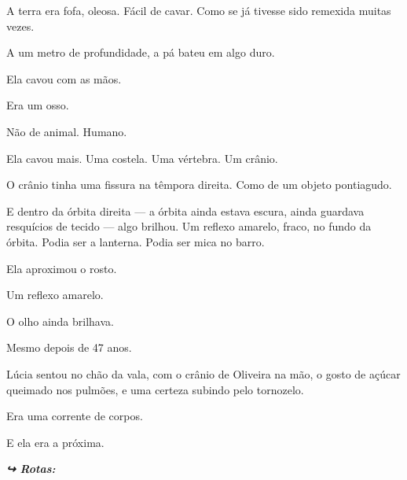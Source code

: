 \noindent A terra era fofa, oleosa. Fácil de cavar. Como se já tivesse sido remexida muitas vezes.

\noindent A um metro de profundidade, a pá bateu em algo duro.

\noindent Ela cavou com as mãos.

\noindent Era um osso.

\noindent Não de animal. Humano.

\noindent Ela cavou mais. Uma costela. Uma vértebra. Um crânio.

\noindent O crânio tinha uma fissura na têmpora direita. Como de um objeto pontiagudo.

\noindent E dentro da órbita direita --- a órbita ainda estava escura, ainda guardava resquícios de tecido --- algo brilhou.
\noindent Um reflexo amarelo, fraco, no fundo da órbita.
\noindent Podia ser a lanterna. Podia ser mica no barro.

\noindent Ela aproximou o rosto.

\noindent Um reflexo amarelo.

\noindent O olho ainda brilhava.

\noindent Mesmo depois de 47 anos.

\noindent Lúcia sentou no chão da vala, com o crânio de Oliveira na mão, o gosto de açúcar queimado nos pulmões, e uma certeza subindo pelo tornozelo.

\noindent Era uma corrente de corpos.

\noindent E ela era a próxima.

\vspace{0.5em}
\noindent\textit{\textbf{↪ Rotas:}  \rotasep {}}